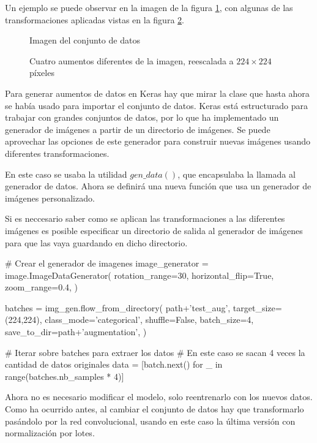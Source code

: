 Un ejemplo se puede observar en la imagen de la figura \ref{aug-original}, con algunas de las transformaciones aplicadas vistas en la figura \ref{augmentations}.

\begin{figure}
    \caption{Imagen del conjunto de datos}
\label{aug-original}
\end{figure}

\begin{figure}
    \caption{Cuatro aumentos diferentes de la imagen, reescalada a $224\times224$ píxeles}
\label{augmentations}
\end{figure}

Para generar aumentos de datos en Keras hay que mirar la clase que hasta ahora se había usado para importar el conjunto de datos. Keras está estructurado para trabajar con grandes conjuntos de datos, por lo que ha implementado un generador de imágenes a partir de un directorio de imágenes. Se puede aprovechar las opciones de este generador para construir nuevas imágenes usando diferentes transformaciones.

En este caso se usaba la utilidad $gen\_data()$, que encapsulaba la llamada al generador de datos. Ahora se definirá una nueva función que usa un generador de imágenes personalizado.

Si es neccesario saber como se aplican las transformaciones a las diferentes imágenes es posible especificar un directorio de salida al generador de imágenes para que las vaya guardando en dicho directorio.

\begin{python}
# Crear el generador de imagenes
image_generator = image.ImageDataGenerator(
    rotation_range=30,
    horizontal_flip=True,
    zoom_range=0.4,
)

batches = img_gen.flow_from_directory(
    path+'test_aug', 
    target_size=(224,224),
    class_mode='categorical',
    shuffle=False,
    batch_size=4,
    save_to_dir=path+'augmentation',
)

# Iterar sobre batches para extraer los datos
# En este caso se sacan 4 veces la cantidad de datos originales
data = [batch.next() for _ in range(batches.nb_samples * 4)]
\end{python}

Ahora no es necesario modificar el modelo, solo reentrenarlo con los nuevos datos. Como ha ocurrido antes, al cambiar el conjunto de datos hay que transformarlo pasándolo por la red convolucional, usando en este caso la última versión con normalización por lotes.

